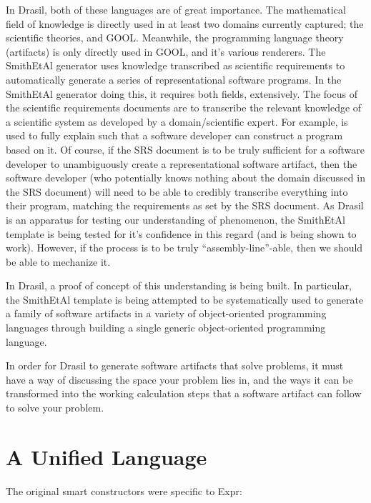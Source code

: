 In Drasil, both of these languages are of great importance. The mathematical
field of knowledge is directly used in at least two domains currently captured;
the scientific theories, and GOOL. Meanwhile, the programming
language theory (artifacts) is only directly used in GOOL, and it's
various renderers. The SmithEtAl generator uses knowledge transcribed
as scientific requirements to automatically generate a series of
representational software programs. In the SmithEtAl generator doing this, it
requires both fields, extensively. The focus of the scientific requirements
documents are to transcribe the relevant knowledge of a scientific system as
developed by a domain/scientific expert. For example,  is
used to fully explain  such that a software developer can
construct a program based on it. Of course, if the SRS document is to be truly
sufficient for a software developer to unambiguously create a representational
software artifact, then the software developer (who potentially knows nothing
about the domain discussed in the SRS document) will need to be able to credibly
transcribe everything into their program, matching the requirements as set by
the SRS document. As Drasil is an apparatus for testing our understanding of
phenomenon, the SmithEtAl template is being tested for it's confidence in this
regard (and is being shown to work). However, if the process is to be truly
``assembly-line''-able, then we should be able to mechanize it.

In Drasil, a proof of concept of this understanding is being built. In
particular, the SmithEtAl template is being attempted to be systematically used
to generate a family of software artifacts in a variety of object-oriented
programming languages through building a single generic
object-oriented programming language.

In order for Drasil to generate software artifacts that solve problems, it must
have a way of discussing the space your problem lies in, and the ways it can be
transformed into the working calculation steps that a software artifact can
follow to solve your problem.

\section{A Unified Language}
\label{sec:modelkinds:language}

\originalExprHaskell

The original smart constructors were specific to Expr:

